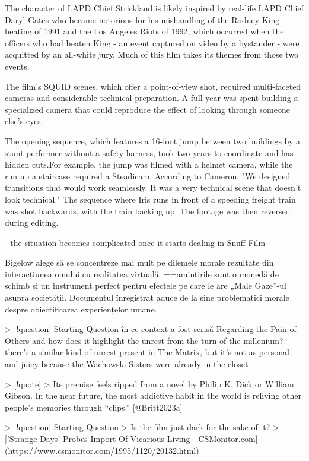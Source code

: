 \documentclass[a4paper, 12pt]{article}
\begin{document}
The character of LAPD Chief Strickland is likely inspired by real-life LAPD Chief Daryl Gates who became notorious for his mishandling of the Rodney King beating of 1991 and the Los Angeles Riots of 1992, which occurred when the officers who had beaten King - an event captured on video by a bystander - were acquitted by an all-white jury. Much of this film takes its themes from those two events.

The film's SQUID scenes, which offer a point-of-view shot, required multi-faceted cameras and considerable technical preparation. A full year was spent building a specialized camera that could reproduce the effect of looking through someone else's eyes.

The opening sequence, which features a 16-foot jump between two buildings by a stunt performer without a safety harness, took two years to coordinate and has hidden cuts.For example, the jump was filmed with a helmet camera, while the run up a staircase required a Steadicam. According to Cameron, "We designed transitions that would work seamlessly. It was a very technical scene that doesn't look technical." The sequence where Iris runs in front of a speeding freight train was shot backwards, with the train backing up. The footage was then reversed during editing.

- the situation becomes complicated once it starts dealing in Snuff Film

Bigelow alege să se concentreze mai mult pe dilemele morale rezultate din interacțiunea omului cu realitatea virtuală. ==amintirile sunt o monedă de schimb și un instrument perfect pentru efectele pe care le are „Male Gaze”-ul asupra societății. Documentul înregistrat aduce de la sine problematici morale despre obiectificarea experiențelor umane.==

> [!question] Starting Question
în ce context a fost scrisă Regarding the Pain of Others and how does it highlight the unrest from the turn of the millenium? there's a similar kind of unrest present in The Matrix, but it's not as personal and juicy because the Wachowski Sisters were already in the closet

> [!quote]
> Its premise feels ripped from a novel by Philip K. Dick or William Gibson. In the near future, the most addictive habit in the world is reliving other people’s memories through “clips.” [@Britt2023a]

> [!question] Starting Question
> Is the film just dark for the sake of it?
> ['Strange Days' Probes Import Of Vicarious Living - CSMonitor.com](https://www.csmonitor.com/1995/1120/20132.html)
\end{document}
